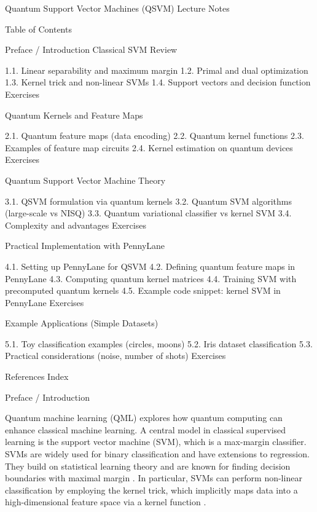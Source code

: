 Quantum Support Vector Machines (QSVM) Lecture Notes







Table of Contents





Preface / Introduction
Classical SVM Review

1.1. Linear separability and maximum margin
1.2. Primal and dual optimization
1.3. Kernel trick and non-linear SVMs
1.4. Support vectors and decision function
Exercises

Quantum Kernels and Feature Maps

2.1. Quantum feature maps (data encoding)
2.2. Quantum kernel functions
2.3. Examples of feature map circuits
2.4. Kernel estimation on quantum devices
Exercises

Quantum Support Vector Machine Theory

3.1. QSVM formulation via quantum kernels
3.2. Quantum SVM algorithms (large-scale vs NISQ)
3.3. Quantum variational classifier vs kernel SVM
3.4. Complexity and advantages
Exercises

Practical Implementation with PennyLane

4.1. Setting up PennyLane for QSVM
4.2. Defining quantum feature maps in PennyLane
4.3. Computing quantum kernel matrices
4.4. Training SVM with precomputed quantum kernels
4.5. Example code snippet: kernel SVM in PennyLane
Exercises

Example Applications (Simple Datasets)

5.1. Toy classification examples (circles, moons)
5.2. Iris dataset classification
5.3. Practical considerations (noise, number of shots)
Exercises

References
Index






Preface / Introduction





Quantum machine learning (QML) explores how quantum computing can enhance classical machine learning.  A central model in classical supervised learning is the support vector machine (SVM), which is a max-margin classifier.  SVMs are widely used for binary classification and have extensions to regression.  They build on statistical learning theory and are known for finding decision boundaries with maximal margin .  In particular, SVMs can perform non-linear classification by employing the kernel trick, which implicitly maps data into a high-dimensional feature space via a kernel function .



